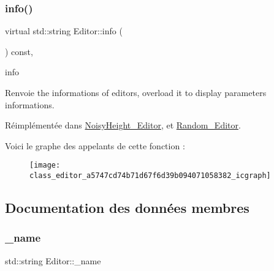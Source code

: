 \subsubsection{\texorpdfstring{info()}{info()}}
{\footnotesize\ttfamily virtual std\+::string Editor\+::info (\begin{DoxyParamCaption}{ }\end{DoxyParamCaption}) const\hspace{0.3cm}{\ttfamily [inline]}, {\ttfamily [virtual]}}



info 

\begin{DoxyReturn}{Renvoie}
the informations of editors, overload it to display parameters informations. 
\end{DoxyReturn}


Réimplémentée dans \hyperlink{class_noisy_height___editor_a4749fe8cb3306252a8f48c8147854578}{Noisy\+Height\+\_\+\+Editor}, et \hyperlink{class_random___editor_aa194991b2926aeab96ad5470f549f087}{Random\+\_\+\+Editor}.

Voici le graphe des appelants de cette fonction \+:
\nopagebreak
\begin{figure}[H]
\begin{center}
\leavevmode
\texttt{[image: class\_editor\_a5747cd74b71d67f6d39b094071058382\_icgraph]}
\end{center}
\end{figure}


\subsection{Documentation des données membres}
\mbox{\label{class_editor_a0ae04e135284b48561a538397106f42a}} 
\subsubsection{\texorpdfstring{\+\_\+name}{\_name}}
{\footnotesize\ttfamily std\+::string Editor\+::\+\_\+name\hspace{0.3cm}{\ttfamily [protected]}}

\mbox{\label{class_editor_ad9f31fcae91fb4a91b5ff5ecb4308bdf}} 
